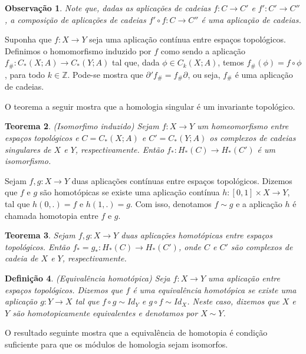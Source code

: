 \documentclass[12pt]{book}
\newtheorem{teorema}{Teorema}[section]
\newtheorem{definicao}[teorema]{Definição}
\newtheorem{observacao}[teorema]{Observação}
\newcommand{\bordo}[1]{\partial_{#1}}
\newcommand{\cadeia}[2]{C_{#1}(#2; A)}
\newcommand{\homologiaabrev}[2]{H_{#1}(#2)}
\newcommand{\induzida}[1]{#1_{\#}}
\newcommand{\inteiros}{\mathbb{Z}}
\newcommand{\intervalo}{[0,1]}
\begin{document}
	\begin{observacao}
		Note que, dadas as aplicações de cadeias $f:C\to C'$ e $f':C'\to C''$, a composição de aplicações de cadeias $f'\circ f:C\to C''$ é uma aplicação de cadeias.
	\end{observacao}
	
	Suponha que $f:X\to Y$ seja uma aplicação contínua entre espaços topológicos. Definimos o homomorfismo induzido por $f$ como sendo a aplicação $\induzida{f}:\cadeia{*}{X}\to \cadeia{*}{Y}$ tal que, dada $\phi \in \cadeia{k}{X}$, temos $\induzida{f}(\phi) = f\circ \phi$, para todo $k \in \inteiros$. Pode-se mostra que $\bordo{}'\induzida{f}=\induzida{f}\bordo{}$, ou seja, $\induzida{f}$ é uma aplicação de cadeias.
	
	O teorema a seguir mostra que a homologia singular é um invariante topológico.
	
	\begin{teorema}
		(Isomorfimo induzido) Sejam $f:X \to Y$ um homeomorfismo entre espaços topológicos e $C = \cadeia{*}{X}$ e $C'=\cadeia{*}{Y}$ os complexos de cadeias singulares de $X$ e $Y$, respectivamente. Então $f_{*}: \homologiaabrev{*}{C} \to \homologiaabrev{*}{C'}$ é um isomorfismo.
	\end{teorema}
	
	Sejam $f, g: X\to Y$ duas aplicações contínuas entre espaços topológicos. Dizemos que $f$ e $g$ são homotópicas se existe uma aplicação contínua $h:\intervalo\times X \to Y$, tal que $h(0, .) = f$ e $h(1, .) = g$. Com isso, denotamos $f\sim g$ e a aplicação $h$ é chamada homotopia entre $f$ e $g$.
	
	\begin{teorema}
		Sejam $f, g: X\to Y$ duas aplicações homotópicas entre espaços topológicos. Então $f_{*}=g_{*}: \homologiaabrev{*}{C}\to \homologiaabrev{*}{C'}$, onde $C$ e $C'$ são complexos de cadeia de $X$ e $Y$, respectivamente.
	\end{teorema}
	
	\begin{definicao}
		(Equivalência homotópica) Seja $f:X\to Y$ uma aplicação entre espaços topológicos. Dizemos que $f$ é uma equivalência homotópica se existe uma aplicação $g:Y \to X$ tal que $f\circ g \sim Id_{Y}$ e $g\circ f \sim Id_{X}$. Neste caso, dizemos que $X$ e $Y$ são homotopicamente equivalentes e denotamos por $X\sim Y$.
	\end{definicao}
	
	O resultado seguinte mostra que a equivalência de homotopia é condição suficiente para que os módulos de homologia sejam isomorfos.
	
\end{document}
